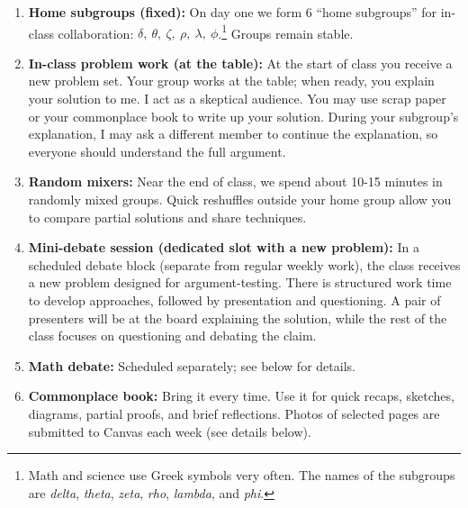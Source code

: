 \documentclass[oneside,11pt]{amsart}
\begin{document}
\begin{enumerate}[$\bullet$]
  \item \textbf{Home subgroups (fixed):} On day one we form 6 ``home subgroups'' for in-class collaboration:
  $\delta, \ \theta, \ \zeta, \ \rho, \ \lambda, \ \phi$.\footnote{Math and science use Greek symbols very often. The names of the subgroups are 
	\emph{delta}, \emph{theta}, \emph{zeta}, \emph{rho}, \emph{lambda}, and \emph{phi}.}
	Groups remain stable.

  \item \textbf{In-class problem work (at the table):} At
	the start of class you receive a new problem set.
	Your group works at the table; when ready, you explain
	your solution to me. I act as a skeptical audience.
	You may use scrap paper or your commonplace book to write up your solution.
	During your subgroup's explanation, I may ask a different member to continue the explanation,
	so everyone should understand the full argument.

  \item \textbf{Random mixers:} 
		Near the end of class, we spend about 10-15 minutes 
		in randomly mixed groups.
		Quick reshuffles outside your home group allow you
		to compare partial solutions and share techniques.
		
	 \item \textbf{Mini-debate session (dedicated slot with a new
	 problem):} In a scheduled debate block (separate from
	 regular weekly work), the class receives a {new}
	 problem designed for argument-testing. There is
	 structured {work time} to develop approaches,
	 followed by {presentation and questioning}. 
	 A pair of presenters will be at the board explaining the
	 solution, while the rest of the class 
	 focuses on questioning and debating the claim.
  
	\item \textbf{Math debate:} Scheduled separately; see below for details.

	\item \textbf{Commonplace book:} Bring it every time.
	Use it for quick recaps, sketches, diagrams, partial
	proofs, and brief reflections. Photos of selected pages
	are submitted to Canvas each week (see details below).


\end{enumerate}
\end{document}
